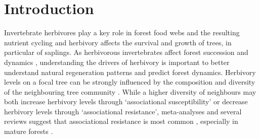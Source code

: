 \documentclass[10pt, twoside]{book} %
\begin{document}
	\section{Introduction}
	Invertebrate herbivores play a key role in forest food webs and the resulting nutrient cycling \citep{Duffy2002} and herbivory affects the survival and growth of trees, in particular of saplings. As herbivorous invertebrates affect forest succession and dynamics \citep{Bagchi2014}, understanding the drivers of herbivory is important to better understand natural regeneration patterns and predict forest dynamics. Herbivory levels on a focal tree can be strongly influenced by the composition and diversity of the neighbouring tree community \citep{Barbosa2009}. While a higher diversity of neighbours may both increase herbivory levels through `associational susceptibility' or decrease herbivory levels through `associational resistance', meta-analyses and several reviews suggest that associational resistance is most common \citep{Andow1991, Balvanera2006}, especially in mature forests \citep{Castagneyrol2014, Jactel2007}.\\
	
\end{document}
